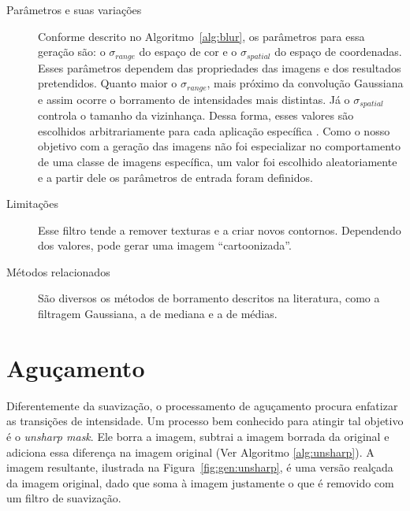 \FloatBarrier
\begin{description}
  \item[Parâmetros e suas variações] Conforme descrito no Algoritmo~\ref{alg:blur}, os parâmetros para essa geração são: o $\sigma_{range}$ do espaço de cor e o $\sigma_{spatial}$ do espaço de coordenadas. Esses parâmetros dependem das propriedades das imagens e dos resultados pretendidos. Quanto maior o $\sigma_{range}$, mais próximo da convolução Gaussiana e assim ocorre o borramento de intensidades mais distintas. Já o $\sigma_{spatial}$ controla o tamanho da vizinhança. Dessa forma, esses valores são escolhidos arbitrariamente para cada aplicação específica \cite{Tomasi1998}. Como o nosso objetivo com a geração das imagens não foi especializar no comportamento de uma classe de imagens específica, um valor foi escolhido aleatoriamente e a partir dele os parâmetros de entrada foram definidos.

  \item[Limitações] Esse filtro tende a remover texturas e a criar novos contornos. Dependendo dos valores, pode gerar uma imagem ``cartoonizada''.

  \item[Métodos relacionados] São diversos os métodos de borramento descritos na literatura, como a filtragem Gaussiana, a de mediana e a de médias.


\end{description}
\section{Aguçamento}

Diferentemente da suavização, o processamento de aguçamento procura enfatizar as transições de intensidade. Um processo bem conhecido para atingir tal objetivo é o \textit{unsharp mask}. Ele borra a imagem, subtrai a imagem borrada da original e adiciona essa diferença na imagem original (Ver Algoritmo \ref{alg:unsharp}). A imagem resultante, ilustrada na Figura~\ref{fig:gen:unsharp}, é uma versão realçada da imagem original, dado que soma à imagem justamente o que é removido com um filtro de suavização.


